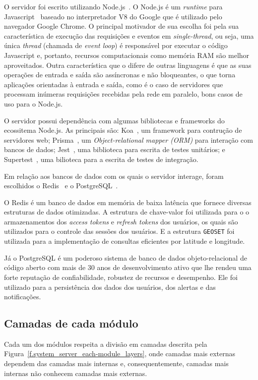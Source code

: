 O servidor foi escrito utilizando Node.js~\cite{node}. O Node.js é um \emph{runtime} para Javascript~\cite{javascript} baseado no interpretador V8 do Google que é utilizado pelo navegador Google Chrome. O principal motivador de sua escolha foi pela sua característica de execução das requisições e eventos em \emph{single-thread}, ou seja, uma única \emph{thread} (chamada de \emph{event loop}) é responsável por executar o código Javascript e, portanto, recursos computacionais como memória RAM são melhor aproveitados. Outra característica que o difere de outras linguagens é que as suas operações de entrada e saída são assíncronas e não bloqueantes, o que torna aplicações orientadas à entrada e saída, como é o caso de servidores que processam inúmeras requisições recebidas pela rede em paralelo, bons casos de uso para o Node.js. 

O servidor possui dependência com algumas bibliotecas e frameworks do ecossitema Node.js. As principais são: Koa~\cite{koa}, um framework para contrução de servidores web; Prisma~\cite{prisma}, um \emph{Object-relational mapper (ORM)} para interação com bancos de dados; Jest~\cite{jest}, uma biblioteca para escrita de testes unitários; e Supertest~\cite{supertest}, uma bilioteca para a escrita de testes de integração.

Em relação aos bancos de dados com os quais o servidor interage, foram escolhidos o Redis~\cite{redis} e o PostgreSQL~\cite{postgresql}. 

O Redis é um banco de dados em memória de baixa latência que fornece diversas estruturas de dados otimizadas. A estrutura de chave-valor foi utilizada para o o armazenamentos dos \emph{access tokens} e \emph{refresh tokens} dos usuários, os quais são utilizados para o controle das sessões dos usuários. E a estrutura \texttt{GEOSET} foi utilizada para a implementação de consultas eficientes por latitude e longitude.

Já o PostgreSQL é um poderoso sistema de banco de dados objeto-relacional de código aberto com mais de 30 anos de desenvolvimento ativo que lhe rendeu uma forte reputação de confiabilidade, robustez de recursos e desempenho. Ele foi utilizado para a persistência dos dados dos usuários, dos alertas e das notificações.

\subsection{Camadas de cada módulo}

Cada um dos módulos respeita a divisão em camadas descrita pela Figura~\ref{f.system_server_each-module_layers}, onde camadas mais externas dependem das camadas mais internas e, consequentemente, camadas mais internas não conhecem camadas mais externas. 

